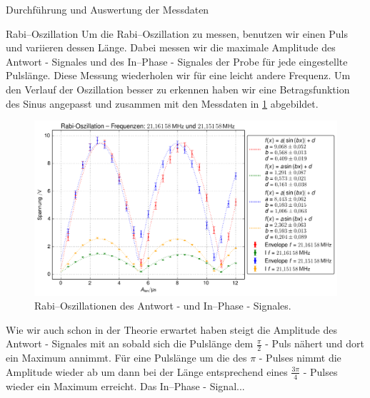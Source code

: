 \documentclass[pdftex, a4paper,11pt, twoside, ngerman]{report}
\begin{document}
\begin{chapter}{Durchführung und Auswertung der Messdaten}
    \begin{section}{Rabi--Oszillation}
      \label{chpRabi}
      Um die Rabi--Oszillation zu messen, benutzen wir einen Puls und variieren
      dessen Länge.
      Dabei messen wir die maximale Amplitude des Antwort - Signales und des
      In--Phase - Signales der Probe für jede eingestellte Pulslänge.
      Diese Messung wiederholen wir für eine leicht andere Frequenz.
      Um den Verlauf der Oszillation besser zu erkennen haben wir eine
      Betragsfunktion des Sinus angepasst und zusammen mit den Messdaten in
      \cref{figRabifreq12} abgebildet.
      \begin{figure}[htbp]
        \centering
        \includegraphics[width=\textwidth]{Figures/Rabi_freq12.png}
        \caption{Rabi--Oszillationen des Antwort - und In--Phase - Signales.}
        \label{figRabifreq12}
      \end{figure}
      
      Wie wir auch schon in der Theorie erwartet haben steigt die Amplitude
      des Antwort - Signales mit an sobald sich die Pulslänge dem
      $\frac{\pi}{2}$ - Puls nähert und dort ein Maximum annimmt.
      Für eine Pulslänge um die des $\pi$ - Pulses nimmt die Amplitude wieder
      ab um dann bei der Länge entsprechend eines $\frac{3\pi}{4}$ - Pulses
      wieder ein Maximum erreicht.
      Das In--Phase - Signal...
      
    \end{section}
    

\end{chapter}
\end{document}
